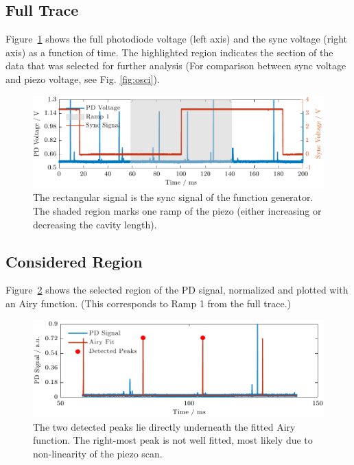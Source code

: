 \documentclass[a4paper,11pt]{article}
\begin{document}
\subsection{Full Trace}
Figure~\ref{fig:full} shows the full photodiode voltage (left axis) and the
sync voltage (right axis) as a function of time. The highlighted region
indicates the section of the data that was selected for further analysis (For comparison between sync voltage and piezo voltage, see Fig. \ref{fig:osci}).

\begin{figure}[H]
    \centering
    \includegraphics[width=\textwidth]{Figure_1.pdf}
    \caption{The rectangular signal is the sync signal of the function generator. The shaded region marks one ramp of the piezo (either increasing or decreasing the cavity length).}
    \label{fig:full}
\end{figure}

\subsection{Considered Region}
Figure~\ref{fig:fit} shows the selected region of the PD signal, normalized and
plotted with an Airy function. (This corresponds to Ramp 1 from the full trace.)

\begin{figure}[H]
    \centering
    \includegraphics[width=\textwidth]{Figure_2.pdf}
    \caption{The two detected peaks lie directly underneath the fitted Airy function. The right-most peak is not well fitted, most likely due to non-linearity of the piezo scan.}
    \label{fig:fit}
\end{figure}
\end{document}
